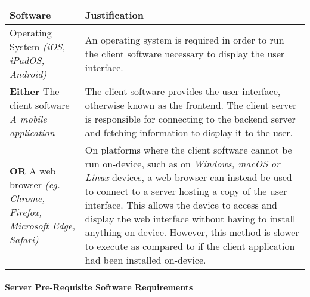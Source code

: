 \documentclass[../../../main.tex]{subfiles}
\begin{document}
\begin{tabular}{ |p{}|p{}| }
    \hline
    \textbf{Software}                                      & \textbf{Justification}                                                                                                                                                                                      \\
    \hline
    Operating System \newline
    \textit{(iOS, iPadOS, Android)}                        &
    An operating system is required in order to run the client software necessary to display the user interface.                                                                                                                                                         \\
    \hline
    \textbf{Either} The client software \newline
    \textit{A mobile application}                          & The client software provides the user interface, otherwise known as the frontend. The client server is responsible for connecting to the backend server and fetching information to display it to the user. \\
    \hline
    \textbf{OR} A web browser \newline
    \textit{(eg. Chrome, Firefox, Microsoft Edge, Safari)} &
    On platforms where the client software cannot be run on-device, such as on \textit{Windows, macOS or Linux} devices, a web browser can instead be used to connect to a server hosting a copy of the user interface. This allows the device to access and display the web interface without having to install anything on-device.
    \newline However, this method is slower to execute as compared to if the client application had been installed on-device.                                                                                                                                            \\
    \hline
\end{tabular}

\paragraph{Server Pre-Requisite Software Requirements\\\\}
\end{document}

